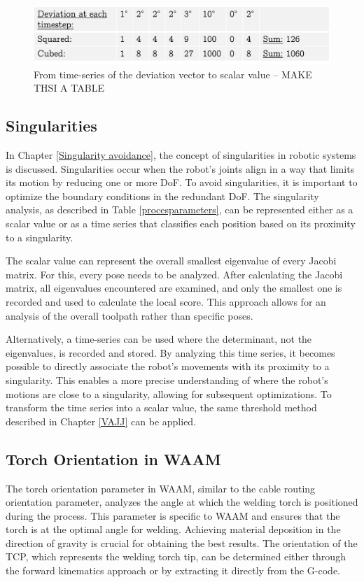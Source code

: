\begin{figure}[H]
	\centerline{\includegraphics[width=.7\textwidth]{figures/devi.png}}
	\caption{From time-series of the deviation vector to scalar value -- MAKE THSI A TABLE}
	\label{deviation}
\end{figure}
 

\subsection{Singularities}

In Chapter \ref{Singularity avoidance}, the concept of singularities in robotic systems is discussed. Singularities occur when the robot's joints align in a way that limits its motion by reducing one or more \acrshort{DoF}. To avoid singularities, it is important to optimize the boundary conditions in the redundant \acrshort{DoF}. The singularity analysis, as described in Table \ref{procesparameters}, can be represented either as a scalar value or as a time series that classifies each position based on its proximity to a singularity.

The scalar value can represent the overall smallest eigenvalue of every Jacobi matrix. For this, every pose needs to be analyzed. After calculating the Jacobi matrix, all eigenvalues encountered are examined, and only the smallest one is recorded and used to calculate the local score. This approach allows for an analysis of the overall toolpath rather than specific poses.

Alternatively, a time-series can be used where the determinant, not the eigenvalues, is recorded and stored. By analyzing this time series, it becomes possible to directly associate the robot's movements with its proximity to a singularity. This enables a more precise understanding of where the robot's motions are close to a singularity, allowing for subsequent optimizations. To transform the time series into a scalar value, the same threshold method described in Chapter \ref{VAJJ} can be applied.
  
  

\subsection{Torch Orientation in WAAM}
The torch orientation parameter in \acrshort{WAAM}, similar to the cable routing orientation parameter, analyzes the angle at which the welding torch is positioned during the process. This parameter is specific to \acrshort{WAAM} and ensures that the torch is at the optimal angle for welding. Achieving material deposition in the direction of gravity is crucial for obtaining the best results. The orientation of the \acrshort{TCP}, which represents the welding torch tip, can be determined either through the forward kinematics approach or by extracting it directly from the G-code.

